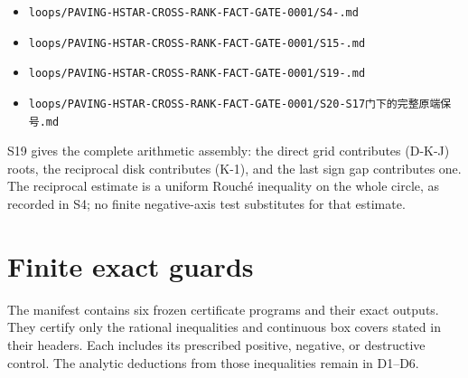\documentclass[10pt]{article}
\begin{document}
\begin{itemize}
\item \texttt{loops/\allowbreak{}PAVING-\allowbreak{}HSTAR-\allowbreak{}CROSS-\allowbreak{}RANK-\allowbreak{}FACT-\allowbreak{}GATE-\allowbreak{}0001/\allowbreak{}S4-.\allowbreak{}md}
\item \texttt{loops/\allowbreak{}PAVING-\allowbreak{}HSTAR-\allowbreak{}CROSS-\allowbreak{}RANK-\allowbreak{}FACT-\allowbreak{}GATE-\allowbreak{}0001/\allowbreak{}S15-.\allowbreak{}md}
\item \texttt{loops/\allowbreak{}PAVING-\allowbreak{}HSTAR-\allowbreak{}CROSS-\allowbreak{}RANK-\allowbreak{}FACT-\allowbreak{}GATE-\allowbreak{}0001/\allowbreak{}S19-.\allowbreak{}md}
\item \texttt{loops/\allowbreak{}PAVING-\allowbreak{}HSTAR-\allowbreak{}CROSS-\allowbreak{}RANK-\allowbreak{}FACT-\allowbreak{}GATE-\allowbreak{}0001/\allowbreak{}S20-\allowbreak{}S17{\cjkfont 门\allowbreak{}下\allowbreak{}的\allowbreak{}完\allowbreak{}整\allowbreak{}原\allowbreak{}端\allowbreak{}保\allowbreak{}号}.\allowbreak{}md}
\end{itemize}

S19 gives the complete arithmetic assembly: the direct grid contributes
(D-K-J) roots, the reciprocal disk contributes (K-1), and the last sign
gap contributes one.  The reciprocal estimate is a uniform Rouché inequality
on the whole circle, as recorded in S4; no finite negative-axis test substitutes
for that estimate.

\section{Finite exact guards}


The manifest contains six frozen certificate programs and their exact outputs.  They
certify only the rational inequalities and continuous box covers stated in
their headers.  Each includes its prescribed positive, negative, or destructive
control.  The analytic deductions from those inequalities remain in D1--D6.
\end{document}
